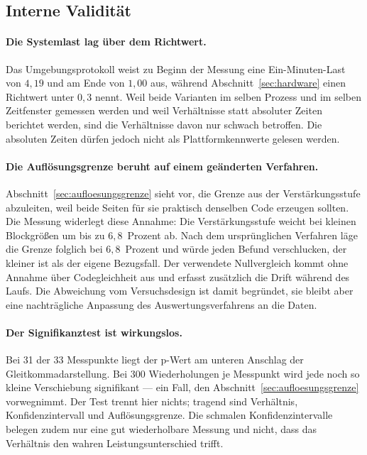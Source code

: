 \subsection{Interne Validität}

\paragraph{Die Systemlast lag über dem Richtwert.}
Das Umgebungsprotokoll weist zu Beginn der Messung eine Ein-Minuten-Last von $4{,}19$ und am Ende von $1{,}00$ aus, während Abschnitt~\ref{sec:hardware} einen Richtwert unter $0{,}3$ nennt. Weil beide Varianten im selben Prozess und im selben Zeitfenster gemessen werden und weil Verhältnisse statt absoluter Zeiten berichtet werden, sind die Verhältnisse davon nur schwach betroffen. Die absoluten Zeiten dürfen jedoch nicht als Plattformkennwerte gelesen werden.

\paragraph{Die Auflösungsgrenze beruht auf einem geänderten Verfahren.}
Abschnitt~\ref{sec:aufloesungsgrenze} sieht vor, die Grenze aus der Verstärkungsstufe abzuleiten, weil beide Seiten für sie praktisch denselben Code erzeugen sollten. Die Messung widerlegt diese Annahme: Die Verstärkungsstufe weicht bei kleinen Blockgrößen um bis zu $6{,}8$~Prozent ab. Nach dem ursprünglichen Verfahren läge die Grenze folglich bei $6{,}8$~Prozent und würde jeden Befund verschlucken, der kleiner ist als der eigene Bezugsfall. Der verwendete Nullvergleich kommt ohne Annahme über Codegleichheit aus und erfasst zusätzlich die Drift während des Laufs. Die Abweichung vom Versuchsdesign ist damit begründet, sie bleibt aber eine nachträgliche Anpassung des Auswertungsverfahrens an die Daten.

\paragraph{Der Signifikanztest ist wirkungslos.}
Bei 31 der 33 Messpunkte liegt der p-Wert am unteren Anschlag der Gleitkommadarstellung. Bei 300 Wiederholungen je Messpunkt wird jede noch so kleine Verschiebung signifikant --- ein Fall, den Abschnitt~\ref{sec:aufloesungsgrenze} vorwegnimmt. Der Test trennt hier nichts; tragend sind Verhältnis, Konfidenzintervall und Auflösungsgrenze. Die schmalen Konfidenzintervalle belegen zudem nur eine gut wiederholbare Messung und nicht, dass das Verhältnis den wahren Leistungsunterschied trifft.

